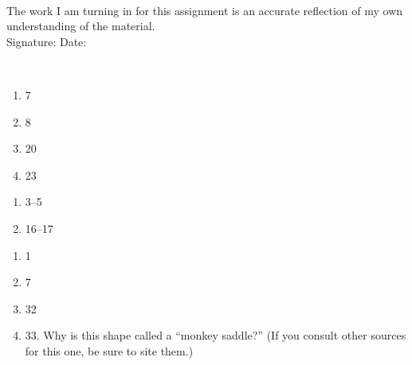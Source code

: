 \documentclass[12pt]{article}
\begin{document}
\\

\bigskip
\bigskip
\bigskip
\bigskip
\bigskip
\bigskip
\noindent The work I am turning in for this assignment is an accurate
reflection of my own understanding of the material.\\[14pt]

\noindent Signature: \underline{\hspace{7cm}} \hspace{1cm} Date:
\underline{\hspace{5cm}} 


\hspace{2mm}\\
\newpage
{}

\begin{enumerate}
\setlength{\itemsep}{-1mm}
  \item 7
  \item 8
  \item 20
  \item 23
\end{enumerate}

\begin{enumerate}
\setlength{\itemsep}{-1mm}
  \item 3--5
  \item 16--17
\end{enumerate}

\begin{enumerate}
\setlength{\itemsep}{-1mm}
  \item 1
  \item 7
  \item 32
  \item 33.  Why is this shape called a ``monkey saddle?''  (If you
    consult other sources for this one, be sure to site them.)
\end{enumerate}
\end{document}
